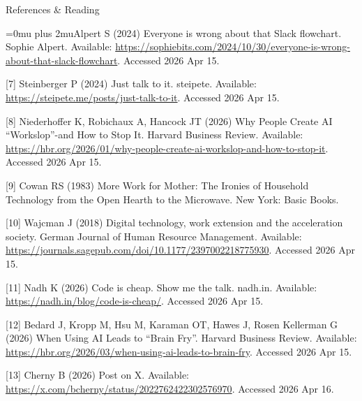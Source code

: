 \documentclass{beamer}
\begin{document}
\begin{frame}{References \& Reading}
\tiny
\raggedright
\sloppy
\Urlmuskip=0mu plus 2mu\relax
[6] Alpert S (2024) Everyone is wrong about that Slack flowchart. Sophie Alpert. Available: \url{https://sophiebits.com/2024/10/30/everyone-is-wrong-about-that-slack-flowchart}. Accessed 2026 Apr 15.

\vspace{0.6em}
[7] Steinberger P (2024) Just talk to it. steipete. Available: \url{https://steipete.me/posts/just-talk-to-it}. Accessed 2026 Apr 15.

\vspace{0.6em}
[8] Niederhoffer K, Robichaux A, Hancock JT (2026) Why People Create AI ``Workslop''-and How to Stop It. Harvard Business Review. Available: \url{https://hbr.org/2026/01/why-people-create-ai-workslop-and-how-to-stop-it}. Accessed 2026 Apr 15.

\vspace{0.6em}
[9] Cowan RS (1983) More Work for Mother: The Ironies of Household Technology from the Open Hearth to the Microwave. New York: Basic Books.

\vspace{0.6em}
[10] Wajcman J (2018) Digital technology, work extension and the acceleration society. German Journal of Human Resource Management. Available: \url{https://journals.sagepub.com/doi/10.1177/2397002218775930}. Accessed 2026 Apr 15.

\vspace{0.6em}
[11] Nadh K (2026) Code is cheap. Show me the talk. nadh.in. Available: \url{https://nadh.in/blog/code-is-cheap/}. Accessed 2026 Apr 15.

\vspace{0.6em}
[12] Bedard J, Kropp M, Hsu M, Karaman OT, Hawes J, Rosen Kellerman G (2026) When Using AI Leads to ``Brain Fry''. Harvard Business Review. Available: \url{https://hbr.org/2026/03/when-using-ai-leads-to-brain-fry}. Accessed 2026 Apr 15.

\vspace{0.6em}
[13] Cherny B (2026) Post on X. Available: \url{https://x.com/bcherny/status/2022762422302576970}. Accessed 2026 Apr 16.
\end{frame}
\end{document}
